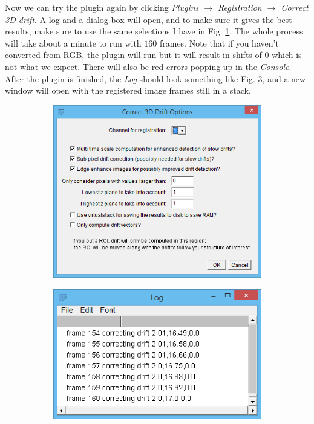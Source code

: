 \documentclass[letterpaper,12pt]{article}
\begin{document}
Now we can try the plugin again by clicking \textcolor{myMagenta}{\textit{Plugins $\rightarrow$ Registration $\rightarrow$ Correct 3D drift}}.  A log and a dialog box will open, and to make sure it gives the best results, make sure to use the same selections I have in Fig. \ref{fig:ImageJ_Registration_Dialog}.  The whole process will take about a minute to run with $160$ frames.  Note that if you haven't converted from RGB, the plugin will run but it will result in shifts of $0$ which is not what we expect.  There will also be red errors popping up in the \textit{Console}.  After the plugin is finished, the \textit{Log} should look something like Fig. \ref{fig:Image_Registration_Log}, and a new window will open with the registered image frames still in a stack.

\begin{figure}[h]
    \centering
    \begin{subfigure}[b]{0.45\textwidth}
        \includegraphics[width=\textwidth]{ImageJ_Registration_Dialog.PNG}
        \caption{}
        \label{fig:ImageJ_Registration_Dialog}
    \end{subfigure}
    \begin{subfigure}[b]{0.45\textwidth}
        \includegraphics[width=\textwidth]{Image_Registration_Log.PNG}
        \caption{}
        \label{fig:Image_Registration_Log}
    \end{subfigure}
 	

\end{figure}
\end{document}
